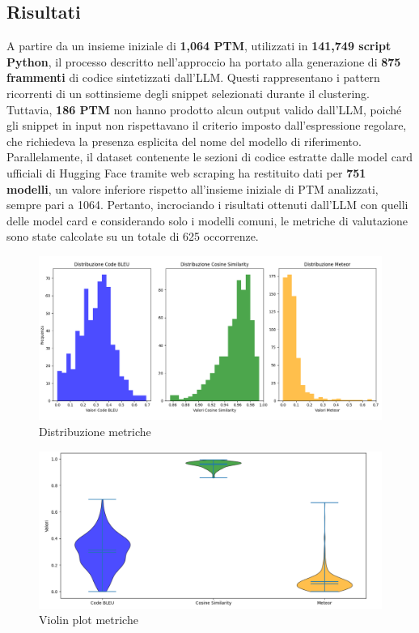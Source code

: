 \documentclass{article}
\begin{document}
\subsection{Risultati}
A partire da un insieme iniziale di \textbf{1,064 PTM}, utilizzati in \textbf{141,749 script Python}, il processo descritto nell’approccio ha portato alla generazione di \textbf{875 frammenti} di codice sintetizzati dall’LLM. Questi rappresentano i pattern ricorrenti di un sottinsieme degli snippet selezionati durante il clustering. Tuttavia, \textbf{186 PTM} non hanno prodotto alcun output valido dall’LLM, poiché gli snippet in input non rispettavano il criterio imposto dall’espressione regolare, che richiedeva la presenza esplicita del nome del modello di riferimento.\\
Parallelamente, il dataset contenente le sezioni di codice estratte dalle model card ufficiali di Hugging Face tramite web scraping ha restituito dati per \textbf{751 modelli}, un valore inferiore rispetto all'insieme iniziale di PTM analizzati, sempre pari a 1064. Pertanto, incrociando i risultati ottenuti dall’LLM con quelli delle model card e considerando solo i modelli comuni, le metriche di valutazione sono state calcolate su un totale di 625 occorrenze.\\
\begin{figure}[htbp]
    \centering
    \includegraphics[width=\textwidth]{images/risultati1.png}
    \caption{Distribuzione metriche}
    \label{fig:risultati1}
\end{figure}
\begin{figure}[htbp]
    \centering
    \includegraphics[width=\textwidth]{images/risultati2.png}
    \caption{Violin plot metriche}
    \label{fig:risultati2}
\end{figure}
\end{document}
